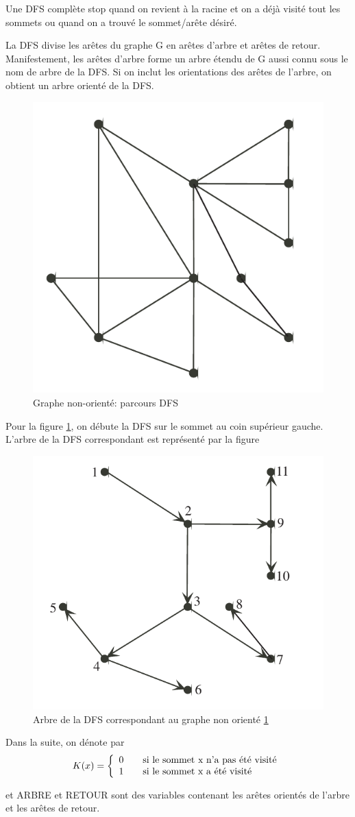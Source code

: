Une DFS complète stop quand on revient à la racine et on a déjà visité tout les sommets ou quand on a trouvé le sommet/arête désiré.

La DFS divise les arêtes du graphe G en arêtes d'arbre et arêtes de retour. Manifestement, les arêtes d'arbre forme un arbre étendu de G aussi connu sous le nom de arbre de la DFS. Si on inclut les orientations des arêtes de l'arbre, on obtient un arbre orienté de la DFS. 
\begin{figure}
\centering
\includegraphics[width=0.3\linewidth]{images/dfs-search-example}
\caption{Graphe non-orienté: parcours DFS}
\label{fig:dfs-search-example}
\end{figure}

Pour la figure \ref{fig:dfs-search-example}, on débute la DFS sur le sommet au coin supérieur gauche.
L'arbre de la DFS correspondant est représenté par la figure 
\begin{figure}
\centering
\includegraphics[width=0.3\linewidth]{images/dfs-tree-non-directed}
\caption{Arbre de la DFS correspondant au graphe non orienté \ref{fig:dfs-search-example}}
\label{fig:dfs-tree-non-directed}
\end{figure}


Dans la suite, on dénote par
\begin{equation*}
 K(x)=\left\{
 \begin{array}{l l}
 0 & \quad \text{si le sommet x n'a pas été visité}\\
 1 & \quad \text{si le sommet x a été visité}
 \end{array} \right.
\end{equation*}

et ARBRE et RETOUR sont des variables contenant les 
arêtes orientés de l'arbre et les arêtes de retour.



